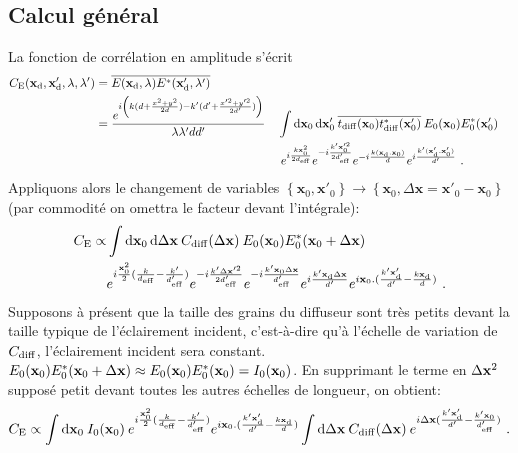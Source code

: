 \subsection{Calcul général}
La fonction de corrélation en amplitude s'écrit
\begin{align}
C_{\mathrm{E}}(\mathbf{x}_{\mathrm{d}},\mathbf{x}_{\mathrm{d}}',\lambda,\lambda')&=\overline{E(\mathbf{x}_{\mathrm{d}},\lambda) E^*(\mathbf{x}_{\mathrm{d}}',\lambda')} \\
\nonumber &=\frac{e^{i \left( k (d+ \frac{x^2+y^2}{2d})-k'(d'+\frac{x'^2+y'^2}{2d'}) \right)}}{\lambda \lambda' d d'} 
&& \int{ \mathop{}\mathopen{}\mathrm{d}\mathbf{x}_0\mathop{}\mathopen{}\mathrm{d}\mathbf{x}_0' \: \overline{t_{\mathrm{diff}}(\mathbf{x}_0) t_{\mathrm{diff}}^*(\mathbf{x}_0')} \: E_0(\mathbf{x}_0) E_0^*(\mathbf{x}_0')} \\ 
& && \; e^{i\frac{k \mathbf{x}_0^2}{2d_{\mathrm{eff}}}} e^{-i\frac{k' \mathbf{x}_0'^2}{2d_{\mathrm{eff}}'}} e^{-i\frac{k(\mathbf{x}_{\mathrm{d}}.\mathbf{x}_0)}{d}} e^{i\frac{k'(\mathbf{x}_{\mathrm{d}}'.\mathbf{x}_0')}{d'}} \text{ .}
\end{align}
Appliquons alors le changement de variables $\left\lbrace \mathbf{x}_0, \mathbf{x}'_0\right\rbrace \rightarrow \left\lbrace \mathbf{x}_0, \Delta\mathbf{x}= \mathbf{x}'_0-\mathbf{x}_0\right\rbrace$ (par commodité on omettra le facteur devant l'intégrale):
\begin{align}
  C_{\mathrm{E}} \propto &\int{\mathop{}\mathopen{}\mathrm{d}\mathbf{x}_0\mathop{}\mathopen{}\mathrm{d}\Delta\mathbf{x}\: C_{\mathrm{diff}}(\Delta\mathbf{x}) \: E_0(\mathbf{x}_0)E_0^*(\mathbf{x}_0+\Delta\mathbf{x})} \\ 
  \nonumber & e^{i \frac{\mathbf{x}_0^2}{2}(\frac{k}{d_{\mathrm{eff}}}-\frac{k'}{d_{\mathrm{eff}}'})} e^{-i\frac{k'\Delta\mathbf{x}'^2}{2d_{\mathrm{eff}}'}} e^{-i\frac{k'\mathbf{x}_0 \Delta\mathbf{x}}{d_{\mathrm{eff}}'}} e^{i\frac{k'\mathbf{x}_{\mathrm{d}} \Delta\mathbf{x}}{d'}} e^{i \mathbf{x}_0.(\frac{k'\mathbf{x}_{\mathrm{d}}'}{d'}-\frac{k\mathbf{x}_{\mathrm{d}}}{d})} \text{ .}
\end{align}
Supposons à présent que la taille des grains du diffuseur sont très petits devant la taille typique de l'éclairement incident, c'est-à-dire qu'à l'échelle de variation de $C_{\mathrm{diff}}$, l'éclairement incident sera constant. $E_0(\mathbf{x}_0)E_0^*(\mathbf{x}_0+\Delta\mathbf{x}) \approx E_0(\mathbf{x}_0)E_0^*(\mathbf{x}_0)=I_0(\mathbf{x}_0)$. En supprimant le terme en $\Delta\mathbf{x}^2$ supposé petit devant toutes les autres échelles de longueur, on obtient: 
\begin{equation}
C_{\mathrm{E}} \propto \int{\mathop{}\mathopen{}\mathrm{d}\mathbf{x}_0\: I_0(\mathbf{x}_0) \: e^{i \frac{\mathbf{x}_0^2}{2}(\frac{k}{d_{\mathrm{eff}}}-\frac{k'}{d_{\mathrm{eff}}'})} e^{i \mathbf{x}_0.(\frac{k'\mathbf{x}_{\mathrm{d}}'}{d'}-\frac{k\mathbf{x}_{\mathrm{d}}}{d})} \int{\mathop{}\mathopen{}\mathrm{d}\Delta\mathbf{x}\: C_{\mathrm{diff}}(\Delta\mathbf{x}) \: e^{i \Delta\mathbf{x}(\frac{k'\mathbf{x}_{\mathrm{d}}'}{d'}-\frac{k'\mathbf{x}_0}{d_{\mathrm{eff}}'})}}} \text{ .}
\end{equation}


